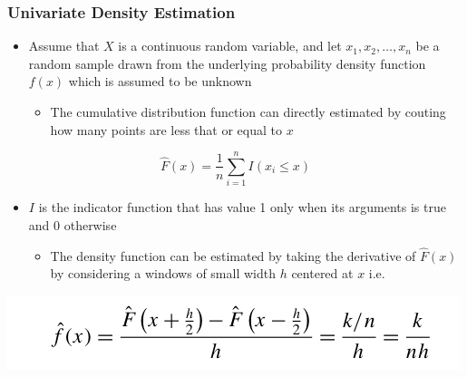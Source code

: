 \documentclass[11pt]{article}
\begin{document}
\subsubsection{Univariate Density Estimation}
\label{sec:orga49b89f}
\begin{itemize}
\item Assume that \(X\) is a continuous random variable, and let \(x_1, x_2, \dots, x_n\) be a random sample drawn from the underlying probability density function \(f(x)\) which is assumed to be unknown
\begin{itemize}
\item The cumulative distribution function can directly estimated by couting how many points are less that or equal to \(x\)
\end{itemize}
\end{itemize}
\begin{equation}
  \hat F (x) = \frac1n \sum_{i=1}^n I(x_i \leq x) 
\end{equation}
\begin{itemize}
\item \(I\) is the indicator function that has value 1 only when its arguments is true and 0 otherwise
\begin{itemize}
\item The density function can be estimated by taking the derivative of \(\hat F(x)\) by considering a windows of small width \(h\) centered at \(x\) i.e.
\end{itemize}
\end{itemize}
\begin{center}
\includegraphics[width=.9\linewidth]{Density-based Clustering/screenshot_2018-12-01_12-14-39.png}
\end{center}
\end{document}
